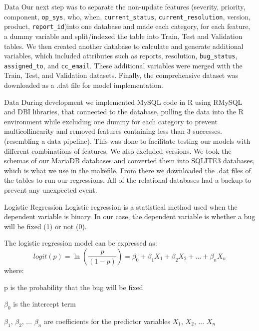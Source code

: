 \documentclass[10pt]{beamer}
\begin{document}
\begin{frame}[t]{Data}\justifying \vspace{20pt}
	Our next step was to separate the non-update features (severity, priority, component, \texttt{op\_sys}, who, when, \texttt{current\_status}, \texttt{current\_resolution}, version, product, \texttt{report\_id})into one database and made each category, for each feature, a dummy variable and split/indexed the table into Train, Test and Validation tables. 
	\vskip 10pt 
	We then created another database to calculate and generate additional variables, which included attributes such as reports, resolution, \texttt{bug\_status}, \texttt{assigned\_to}, and \texttt{cc\_email}. These additional variables were merged with the Train, Test, and Validation datasets. Finally, the comprehensive dataset was downloaded as a .dat file for model implementation.
\end{frame}


\begin{frame}[t]{Data}\justifying \vspace{20pt}
	During development we implemented MySQL code in R using RMySQL and DBI libraries, that connected to the database, pulling the data into the R environment while excluding one dummy for each category to prevent multicollinearity and removed features containing less than 3 successes. (resembling a data pipeline). This was done to facilitate testing our models with different combinations of features. We also excluded versions. We took the schemas of our MariaDB databases and converted them into SQLITE3 databases, which is what we use in the makefile. From there we downloaded the .dat files of the tables to run our regressions. All of the relational databases had a backup to prevent any unexpected event.
\end{frame}


\begin{frame}[t]{Logistic Regression} \justifying \vspace{10pt}
	Logistic regression is a statistical method used when the dependent variable is binary. In our case, the dependent variable is whether a bug will be fixed (1) or not (0).
	
	The logistic regression model can be expressed as:
	\[ logit\left( p\right)=\ln \left( \dfrac{p}{\left( 1-p\right) }\right) =\beta_{0}+\beta _{1}X_{1}+\beta _{2}X_{2}+\ldots +\beta_{n}X_{n} \]
	where:
	\begin{description}[font=$\bullet$~\normalfont\scshape\color{red!50!black}]
	\item p is the probability that the bug will be fixed
	\item $\beta_{0}$ is the intercept term
	\item $\beta_{1}$, $\beta_{2}$, ... $\beta_{n}$ are coefficients for the predictor variables $X_{1}$, $X_{2}$, ... $X_{n}$
	\end{description}
\end{frame}
\end{document}
